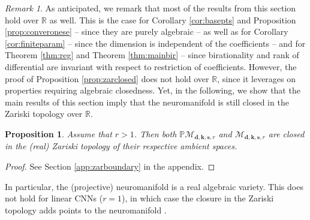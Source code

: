 \documentclass[twoside]{article}
\theoremstyle{plain}%
\newtheorem{prop}[thm]{Proposition}
\theoremstyle{definition}
\newtheorem{defn}{Definition}
\theoremstyle{remark}
\newtheorem{rmk}{Remark}[section]
\begin{document}
\begin{rmk}\label{rem:realcase}
As anticipated, we remark that most of the results from this section hold over $\mathbb{R}$ as well. This is the case for Corollary \ref{cor:basepts} and Proposition \ref{prop:converonese} -- since they are purely algebraic -- as well as for Corollary \ref{cor:finiteparam} -- since the dimension is independent of the coefficients -- and for Theorem \ref{thm:reg} and Theorem \ref{thm:mainbir} -- since birationality and rank of differential are invariant with respect to restriction of coefficients. However, the proof of Proposition \ref{prop:zarclosed} does not hold over $\mathbb{R}$, since it leverages on properties requiring algebraic closedness. Yet, in the following, we show that the main results of this section imply that the neuromanifold is still closed in the Zariski topology over $\mathbb{R}$.  
\end{rmk}
\begin{prop}\label{prop:zarboundary}
Assume that $r>1$. Then both $\mathbb{P}\mathcal{M}_{\mathbf{d}, \mathbf{k}, \mathbf{s}, r}$ and $\mathcal{M}_{\mathbf{d}, \mathbf{k}, \mathbf{s}, r}$ are closed in the (real) Zariski topology of their respective ambient spaces. 
\end{prop}
\begin{proof}
See Section \ref{app:zarboundary} in the appendix.
\end{proof}
In particular, the (projective) neuromanifold is a real algebraic variety. This does not hold for linear CNNs ($r=1$), in which case the closure in the Zariski topology adds points to the neuromanifold \parencite{kohn2023function}. 
\end{document}
